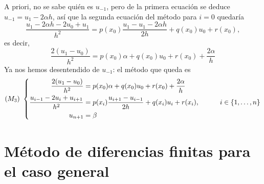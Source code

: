 \documentclass[11pt]{report}
\theoremstyle{mytheorem}
\theoremstyle{mydefinition}
\theoremstyle{myexample}
\begin{document}
A priori, no se sabe quién es $u_{-1}$, pero de la primera ecuación se deduce $u_{-1} = u_1-2\alpha h$, así que la segunda ecuación del método para $i=0$ quedaría
\[\frac{u_1-2\alpha h-2u_0+u_{1}}{h^2} = p(x_0)\frac{u_{1}-u_1-2\alpha h}{2h}+q(x_0)u_0+r(x_0),\] 
es decir,
\[\frac{2(u_1-u_0)}{h^2} = p(x_0)\alpha+q(x_0)u_0+r(x_0)+\frac{2\alpha}{h}\]
Ya nos hemos desentendido de $u_{-1}$: el método que queda es
\[
(M_3) \ \left\{ \begin{alignedat}{1}
\frac{2(u_1-u_0)}{h^2} &= p(x_0)\alpha+q(x_0)u_0+r(x_0)+\frac{2\alpha}{h} \\
\frac{u_{i-1}-2u_i+u_{i+1}}{h^2} &= p(x_i)\frac{u_{i+1}-u_{i-1}}{2h}+q(x_i)u_i+r(x_i), \quad \quad \quad i \in \{1,\mathellipsis,n\} \\
u_{n+1} &=\beta
\end{alignedat} \right.
\]


\section{Método de diferencias finitas para el caso general}
\end{document}
